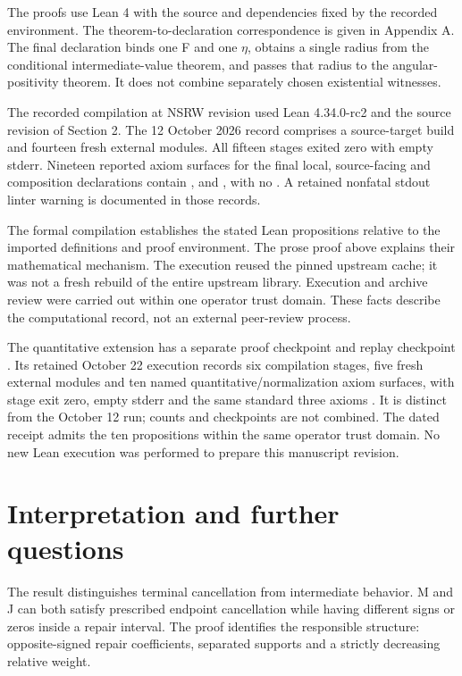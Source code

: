 \documentclass[11pt,a4paper]{article}
\begin{document}
The proofs use Lean 4 \cite{ref3} with the source and dependencies fixed by the recorded environment. The theorem-to-declaration correspondence is given in Appendix A. The final declaration binds one F and one \ensuremath{\eta}, obtains a single radius from the conditional intermediate-value theorem, and passes that radius to the angular-positivity theorem. It does not combine separately chosen existential witnesses.

The recorded compilation at NSRW revision  used Lean 4.34.0-rc2 and the source revision of Section 2. The 12 October 2026 record comprises a source-target build and fourteen fresh external modules. All fifteen stages exited zero with empty stderr. Nineteen reported axiom surfaces for the final local, source-facing and composition declarations contain ,  and , with no  \cite{ref4,ref5}. A retained nonfatal stdout linter warning is documented in those records.

The formal compilation establishes the stated Lean propositions relative to the imported definitions and proof environment. The prose proof above explains their mathematical mechanism. The execution reused the pinned upstream cache; it was not a fresh rebuild of the entire upstream library. Execution and archive review were carried out within one operator trust domain. These facts describe the computational record, not an external peer-review process.

The quantitative extension has a separate proof checkpoint  and replay checkpoint . Its retained October 22 execution records six compilation stages, five fresh external modules and ten named quantitative/normalization axiom surfaces, with stage exit zero, empty stderr and the same standard three axioms \cite{ref6}. It is distinct from the October 12 run; counts and checkpoints are not combined. The dated receipt admits the ten propositions within the same operator trust domain. No new Lean execution was performed to prepare this manuscript revision.

\section{Interpretation and further questions}

The result distinguishes terminal cancellation from intermediate behavior. M and J can both satisfy prescribed endpoint cancellation while having different signs or zeros inside a repair interval. The proof identifies the responsible structure: opposite-signed repair coefficients, separated supports and a strictly decreasing relative weight.
\end{document}
